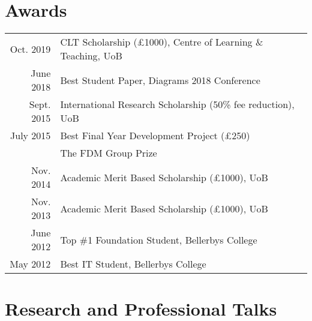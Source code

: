 \documentclass[a4paper,11pt]{article} %
\begin{document}
\section{Awards}

\begin{tabular}{rl}

Oct. 2019 & CLT Scholarship (£1000), Centre of Learning \& Teaching, UoB\\

June 2018 & Best Student Paper, Diagrams 2018 Conference\\

Sept. 2015 & International Research Scholarship (50\% fee reduction), UoB\\

July 2015 & Best Final Year Development Project (£250)\\ &The FDM Group Prize \\

Nov. 2014 & Academic Merit Based Scholarship (£1000), UoB \\

Nov. 2013 & Academic Merit Based Scholarship (£1000), UoB \\

June 2012 & Top \#1 Foundation Student, Bellerbys College \\

May 2012 & Best IT Student, Bellerbys College \\

\end{tabular}


\section{Research and Professional Talks}
\end{document}
